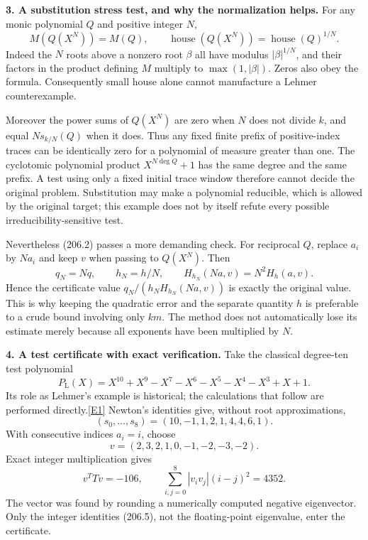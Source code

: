 \documentclass[11pt,a4paper]{article}
\newcommand{\eref}[2]{\hyperlink{extra:#1:#2}{[E#2]}}
\begin{document}
\textbf{3. A substitution stress test, and why the normalization helps.}
For any monic polynomial $Q$ and positive integer $N$,
\[
 M(Q(X^N))=M(Q),\qquad
 \operatorname{house}(Q(X^N))=
 \operatorname{house}(Q)^{1/N}. \tag{206.4}
\]
Indeed the $N$ roots above a nonzero root $\beta$ all have modulus
$|\beta|^{1/N}$, and their factors in the product defining $M$ multiply
to $\max(1,|\beta|)$. Zeros also obey the formula. Consequently small
house alone cannot manufacture a Lehmer counterexample.

Moreover the power sums of $Q(X^N)$ are zero when $N$ does not divide
$k$, and equal $N s_{k/N}(Q)$ when it does. Thus any fixed finite prefix
of positive-index traces can be identically zero for a polynomial of
measure greater than one. The cyclotomic polynomial product
$X^{N\deg Q}+1$ has the same degree and the same prefix. A test using
only a fixed initial trace window therefore cannot decide the original
problem. Substitution may make a polynomial reducible, which is allowed
by the original target; this example does not by itself refute every
possible irreducibility-sensitive test.

Nevertheless (206.2) passes a more demanding check. For reciprocal $Q$,
replace $a_i$ by $Na_i$ and keep $v$ when passing to $Q(X^N)$. Then
\[
 q_N=Nq,\qquad h_N=h/N,\qquad
 H_{h_N}(Na,v)=N^2H_h(a,v).
\]
Hence the certificate value $q_N/(h_NH_{h_N}(Na,v))$ is exactly the
original value. This is why keeping the quadratic error and the separate
quantity $h$ is preferable to a crude bound involving only $km$.
The method does not automatically lose its estimate merely because
all exponents have been multiplied by $N$.

\textbf{4. A test certificate with exact verification.}
Take the classical degree-ten test polynomial
\[
 P_\mathrm L(X)=X^{10}+X^9-X^7-X^6-X^5-X^4-X^3+X+1.
\]
Its role as Lehmer's example is historical; the calculations that follow
are performed directly.\eref{statement}{1}
Newton's identities give, without root approximations,
\[
 (s_0,\ldots,s_8)=(10,-1,1,2,1,4,4,6,1).
\]
With consecutive indices $a_i=i$, choose
\[
 v=(2,3,2,1,0,-1,-2,-3,-2).
\]
Exact integer multiplication gives
\[
 v^TTv=-106,\qquad
 \sum_{i,j=0}^8|v_iv_j|(i-j)^2=4352. \tag{206.5}
\]
The vector was found by rounding a numerically computed negative
eigenvector. Only the integer identities (206.5), not the floating-point
eigenvalue, enter the certificate.
\end{document}
